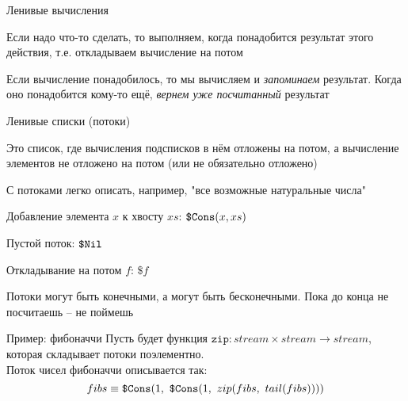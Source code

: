 \begin{frame}{Ленивые вычисления}

\begin{idea}
Если надо что-то сделать, то выполняем, когда понадобится результат этого действия, т.е. откладываем вычисление на потом
\end{idea}

\begin{idea}
Если вычисление понадобилось, то мы вычисляем и \emph{запоминаем} результат. Когда оно понадобится кому-то ещё, \emph{вернем уже посчитанный} результат
\end{idea}

\end{frame}

\begin{frame}{Ленивые списки (потоки)}
\begin{definition}
Это список, где вычисления подсписков в нём отложены на потом, а вычисление элементов не отложено на потом (или не обязательно отложено)
\end{definition}
С потоками легко описать, например, "все возможные натуральные числа"\vspace{1em}

\begin{notation}
Добавление элемента $x$ к хвосту $xs$: $\texttt{\$Cons}(x,xs)$

Пустой поток: $\texttt{\$Nil}$

Откладывание на потом $f$: $\texttt{\$}f$
\end{notation}
\begin{remark}
Потоки могут быть конечными, а могут быть бесконечными. Пока до конца не посчитаешь -- не поймешь
\end{remark}
\end{frame}

\begin{frame}{Пример: фибоначчи}
Пусть будет функция $\texttt{zip}: stream\times stream \rightarrow stream$, которая складывает потоки поэлементно.\\

Поток чисел фибоначчи описывается так:
\[
fibs \equiv \texttt{\$Cons}(1,\ \texttt{\$Cons}(1,\ zip(fibs,\ tail(fibs))))
\]
\begin{center}

\end{center}
\end{frame}
